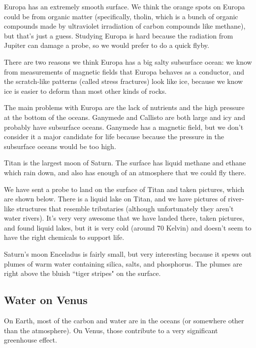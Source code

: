 \documentclass[class=article, crop=false]{standalone}
\begin{document}
Europa has an extremely smooth surface. We think the orange spots on Europa could be from organic matter (specifically, tholin, which is a bunch of organic compounds made by ultraviolet irradiation of carbon compounds like methane), but that's just a guess. Studying Europa is hard because the radiation from Jupiter can damage a probe, so we would prefer to do a quick flyby.
\par
There are two reasons we think Europa has a big salty subsurface ocean: we know from measurements of magnetic fields that Europa behaves as a conductor, and the scratch-like patterns (called stress fractures) look like ice, because we know ice is easier to deform than most other kinds of rocks.
\par
The main problems with Europa are the lack of nutrients and the high pressure at the bottom of the oceans.
Ganymede and Callisto are both large and icy and probably have subsurface oceans. Ganymede has a magnetic field, but we don't consider it a major candidate for life because because the pressure in the subsurface oceans would be too high.
\par
Titan is the largest moon of Saturn. The surface has liquid methane and ethane which rain down, and also has enough of an atmosphere that we could fly there.
\par
We have sent a probe to land on the surface of Titan and taken pictures, which are shown below. There is a liquid lake on Titan, and we have pictures of river-like structures that resemble tributaries (although unfortunately they aren't water rivers). It's very very awesome that we have landed there, taken pictures, and found liquid lakes, but it is very cold (around 70 Kelvin) and doesn't seem to have the right chemicals to support life.
\par
Saturn's moon Enceladus is fairly small, but very interesting because it spews out plumes of warm water containing silica, salts, and phosphorus. The plumes are right above the bluish ``tiger stripes" on the surface.
\subsection{Water on Venus}
On Earth, most of the carbon and water are in the oceans (or somewhere other than the atmosphere). On Venus, those contribute to a very significant greenhouse effect.
\end{document}
